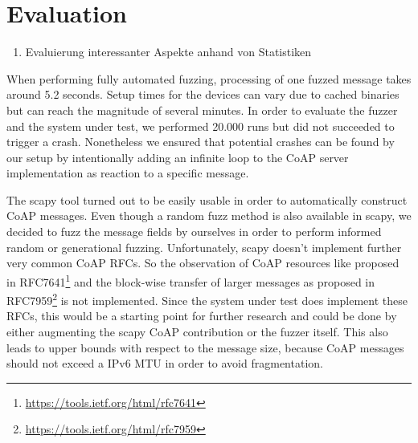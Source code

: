 \section{Evaluation}

\begin{enumerate}
	\item Evaluierung interessanter Aspekte anhand von Statistiken
\end{enumerate}

When performing fully automated fuzzing, processing of one fuzzed message takes around 5.2 seconds. Setup times for the devices can vary due to cached binaries but can reach the magnitude of several minutes. In order to evaluate the fuzzer and the system under test, we performed 20.000 runs but did not succeeded to trigger a crash. Nonetheless we ensured that potential crashes can be found by our setup by intentionally adding an infinite loop to the CoAP server implementation as reaction to a specific message.  

The scapy tool turned out to be easily usable in order to automatically construct CoAP messages. Even though a random fuzz method is also available in scapy, we decided to fuzz the message fields by ourselves in order to perform informed random or generational fuzzing. Unfortunately, scapy doesn't implement further very common CoAP RFCs. So the observation of CoAP resources like proposed in RFC7641\footnote{\url{https://tools.ietf.org/html/rfc7641}} and the block-wise transfer of larger messages as proposed in RFC7959\footnote{\url{https://tools.ietf.org/html/rfc7959}} is not implemented. Since the system under test does implement these RFCs, this would be a starting point for further research and could be done by either augmenting the scapy CoAP contribution or the fuzzer itself. This also leads to upper bounds with respect to the message size, because CoAP messages should not exceed a IPv6 MTU in order to avoid fragmentation. 

